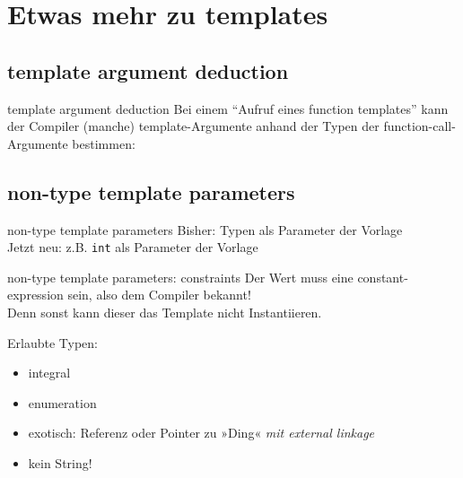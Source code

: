 \section{Etwas mehr zu templates}


\subsection{template argument deduction}

\begin{frame}[t]{template argument deduction}
	Bei einem \enquote{Aufruf eines function templates} kann der Compiler (manche) template-Argumente anhand der Typen der function-call-Argumente bestimmen:
	
	\onslide*<+> {  }
	\onslide<+-> {  }
\end{frame}


\subsection{non-type template parameters}

\begin{frame}[t]{non-type template parameters}
	Bisher: Typen als Parameter der Vorlage\\
	\onslide<2> { Jetzt neu: z.B. \texttt{int} als Parameter der Vorlage }
	
	 {  }
	\onslide<2> {  }
\end{frame}

\begin{frame}{non-type template parameters: constraints}
	Der Wert muss eine constant-expression sein, also dem Compiler bekannt!	\\
	Denn sonst kann dieser das Template nicht Instantiieren.
	
	\vspace{2em}
	
	Erlaubte Typen:
	\begin{itemize}
		\item integral
		\item enumeration
		\item exotisch: Referenz oder Pointer zu »Ding« \emph{mit external linkage}
		\item kein String!
	\end{itemize}
\end{frame}
